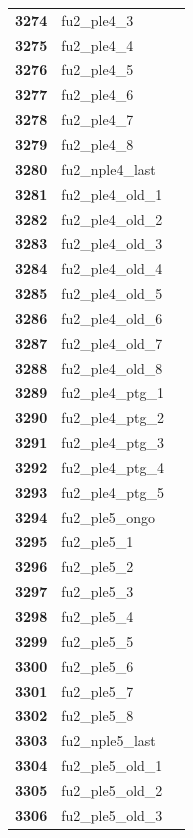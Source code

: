 \documentclass[
  letterpaper,
  DIV=11,
  numbers=noendperiod]{scrartcl}
\begin{document}
\begin{longtable}[t]{>{}cll}
\textbf{3274} & fu2\_ple4\_3 & \\
\textbf{3275} & fu2\_ple4\_4 & \\
\addlinespace
\textbf{3276} & fu2\_ple4\_5 & \\
\textbf{3277} & fu2\_ple4\_6 & \\
\textbf{3278} & fu2\_ple4\_7 & \\
\textbf{3279} & fu2\_ple4\_8 & \\
\textbf{3280} & fu2\_nple4\_last & \\
\addlinespace
\textbf{3281} & fu2\_ple4\_old\_1 & \\
\textbf{3282} & fu2\_ple4\_old\_2 & \\
\textbf{3283} & fu2\_ple4\_old\_3 & \\
\textbf{3284} & fu2\_ple4\_old\_4 & \\
\textbf{3285} & fu2\_ple4\_old\_5 & \\
\addlinespace
\textbf{3286} & fu2\_ple4\_old\_6 & \\
\textbf{3287} & fu2\_ple4\_old\_7 & \\
\textbf{3288} & fu2\_ple4\_old\_8 & \\
\textbf{3289} & fu2\_ple4\_ptg\_1 & \\
\textbf{3290} & fu2\_ple4\_ptg\_2 & \\
\addlinespace
\textbf{3291} & fu2\_ple4\_ptg\_3 & \\
\textbf{3292} & fu2\_ple4\_ptg\_4 & \\
\textbf{3293} & fu2\_ple4\_ptg\_5 & \\
\textbf{3294} & fu2\_ple5\_ongo & \\
\textbf{3295} & fu2\_ple5\_1 & \\
\addlinespace
\textbf{3296} & fu2\_ple5\_2 & \\
\textbf{3297} & fu2\_ple5\_3 & \\
\textbf{3298} & fu2\_ple5\_4 & \\
\textbf{3299} & fu2\_ple5\_5 & \\
\textbf{3300} & fu2\_ple5\_6 & \\
\addlinespace
\textbf{3301} & fu2\_ple5\_7 & \\
\textbf{3302} & fu2\_ple5\_8 & \\
\textbf{3303} & fu2\_nple5\_last & \\
\textbf{3304} & fu2\_ple5\_old\_1 & \\
\textbf{3305} & fu2\_ple5\_old\_2 & \\
\addlinespace
\textbf{3306} & fu2\_ple5\_old\_3 & \\

\end{longtable}
\end{document}
